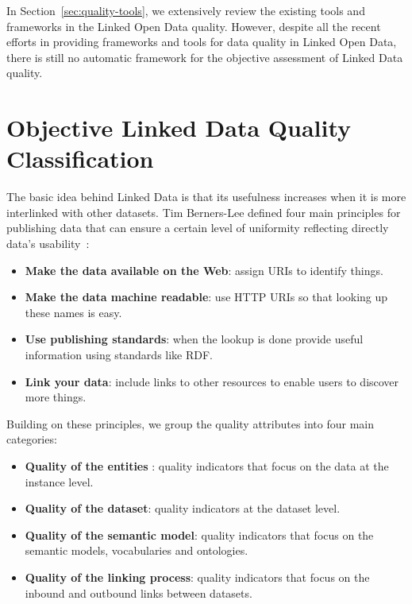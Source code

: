 \documentclass[onecolumn, crcready]{../../Tools/LaTEX/iosart2c}
\begin{document}
In Section~\ref{sec:quality-tools}, we extensively review the existing tools and frameworks in the Linked Open Data quality. However, despite all the recent efforts in providing frameworks and tools for data quality in Linked Open Data, there is still no automatic framework for the objective assessment of Linked Data quality.


\section{Objective Linked Data Quality Classification}
\label{sec:data-quality-classification}
The basic idea behind Linked Data is that its usefulness increases when it is more interlinked with other datasets. Tim Berners-Lee defined four main principles for publishing data that can ensure a certain level of uniformity reflecting directly data's usability~\cite{Berners-Lee:W3C:06}:

\begin{itemize}
	\item \textbf{Make the data available on the Web}: assign URIs to identify things.
	\item \textbf{Make the data machine readable}: use HTTP URIs so that looking up these names is easy.
	\item \textbf{Use publishing standards}: when the lookup is done provide useful information using standards like RDF.
	\item \textbf{Link your data}: include links to other resources to enable users to discover more things.
\end{itemize}

\noindent
Building on these principles, we group the quality attributes into four main categories:

\begin{itemize}
	\item \textbf{Quality of the entities }: quality indicators that focus on the data at the instance level.
	\item \textbf{Quality of the dataset}: quality indicators at the dataset level.
	\item \textbf{Quality of the semantic model}: quality indicators that focus on the semantic models, vocabularies and ontologies.
	\item \textbf{Quality of the linking process}: quality indicators that focus on the inbound and outbound links between datasets.
\end{itemize}
\end{document}
